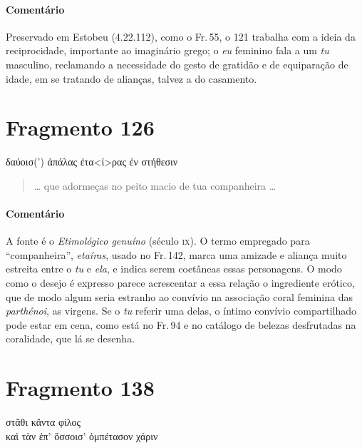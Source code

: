 \medskip

{\paragraph{Comentário} Preservado em Estobeu (4.22.112), como o Fr.\,55, o 121 trabalha com a ideia da
reciprocidade, importante ao imaginário grego; o \textit{eu} feminino fala a um \textit{tu}
masculino, reclamando a necessidade do gesto de gratidão e de equiparação de
idade, em se tratando de alianças, talvez a do casamento.}

\section{Fragmento 126}

\begin{gkverse}
δαύοισ(’) ἀπάλας ἐτα<ί>ρας ἐν στήθεσιν
\end{gkverse}

\begin{verse}
\ldots{} que adormeças no peito macio de tua companheira \ldots{} 
\end{verse}

\medskip

{\paragraph{Comentário} A fonte é o \textit{Etimológico genuíno }(século \textsc{ix}). O termo empregado para
``companheira'', \textit{etaíras}, usado no Fr.\,142, marca uma amizade e aliança muito estreita entre o \textit{tu}
e \textit{ela}, e indica serem coetâneas essas personagens. O modo como o desejo é expresso parece acrescentar a essa relação o
ingrediente erótico, que de modo algum seria estranho ao convívio na associação coral feminina das \textit{parthénoi}, as virgens. Se o \textit{tu} referir uma delas, o íntimo convívio compartilhado pode estar em cena, como está no Fr.\,94 e no catálogo de belezas desfrutadas na coralidade, que lá se desenha.}




\pagebreak
\section{Fragmento 138}

\begin{gkverse}
στᾶθι \dagger{}κἄντα\dagger{} φίλος\\
καὶ τὰν ἐπ’ ὄσσοισ’ ὀμπέτασον χάριν
\end{gkverse}

